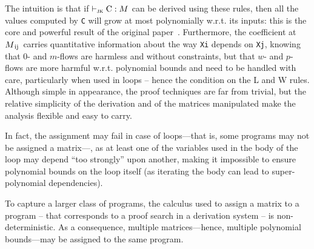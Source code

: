 \documentclass[runningheads]{llncs}
\makeatletter
\newcommand{\pr}{\lstinline[mathescape]}
\newcommand*{\wrt}{w.r.t.\@\xspace}
\newcommand{\vdashJK}{\vdash_{\textsc{jk}}} \allowdisplaybreaks[1] %
\makeatother
\begin{document}
The intuition is that if \(\vdashJK \text{\pr|C|}:M\) can be derived using these rules, then all the values computed by \pr|C| will grow at most polynomially \wrt its inputs: this is the core and powerful result of the original paper~\cite[Theorem 5.3]{Jones2009}.
Furthermore, the coefficient at \(M_{\text{\pr|ij|}}\) carries quantitative information about the way \pr|Xi| depends on \pr|Xj|, knowing that \(0\)- and \(m\)-flows are harmless and without constraints, but that \(w\)- and \(p\)- flows are more harmful \wrt polynomial bounds and need to be handled with care, particularly when used in loops -- hence the condition on the L and W rules.
Although simple in appearance, the proof techniques are far from trivial, but the relative simplicity of the derivation and of the matrices manipulated make the analysis flexible and easy to carry.

In fact, the assignment may fail in case of loops---that is, some programs may not be assigned a matrix---, as at least one of the variables used in the body of the loop may depend \enquote{too strongly} upon another, making it impossible to ensure polynomial bounds on the loop itself (as iterating the body can lead to super-polynomial dependencies).

To capture a larger class of programs, the calculus used to assign a matrix to a program -- that corresponds to a proof search in a derivation system -- is non-deterministic.
As a consequence, multiple matrices---hence, multiple polynomial bounds---may be assigned to the same program.
\end{document}
